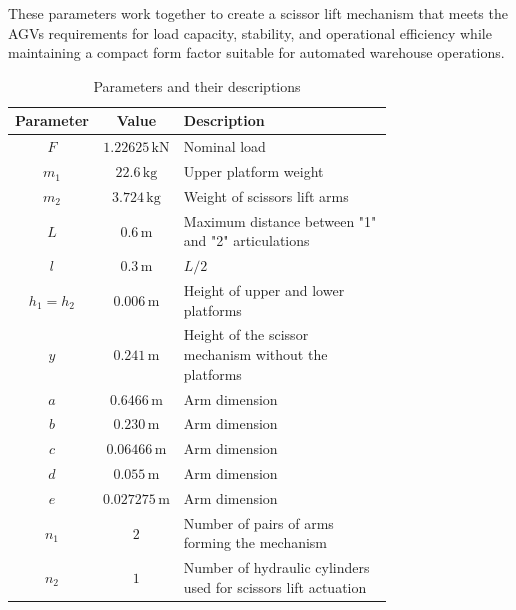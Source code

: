 \documentclass[../../main]{subfiles}
\begin{document}
These parameters work together to create a scissor lift mechanism that
meets the AGV\textquotesingle s requirements for load capacity,
stability, and operational efficiency while maintaining a compact form
factor suitable for automated warehouse operations.
\newpage
\renewcommand{\arraystretch}{1.4} %
\begin{table}[h!]
  \centering
  \begin{tcolorbox}[
    colback=red!5!white,colframe=red!75!black,
    title={\textbf{Parameters}},
    fonttitle=\bfseries, coltitle=white, width=\linewidth
]
  \begin{adjustbox}{max width=\linewidth} %
  \begin{tabular}{|c|c|p{0.75\linewidth}|}
  \hline\rowcolor{red!20}
  \textbf{Parameter} & \textbf{Value} & \textbf{Description} \\ \hline
  $F$ & $1.22625 \, \text{kN}$ & Nominal load \\ \hline
  $m_1$ & $22.6 \, \text{kg}$ & Upper platform weight \\ \hline
  $m_2$ & $3.724 \, \text{kg}$ & Weight of scissors lift arms \\ \hline
  $L$ & $0.6 \, \text{m}$ & Maximum distance between "1" and "2" articulations \\ \hline
  $l$ & $0.3 \, \text{m}$ & $L/2$ \\ \hline
  $h_1 = h_2$ & $0.006 \, \text{m}$ & Height of upper and lower platforms \\ \hline
  $y$ & $0.241 \, \text{m}$ & Height of the scissor mechanism without the platforms \\ \hline
  $a$ & $0.6466 \, \text{m}$ & Arm dimension \\ \hline
  $b$ & $0.230 \, \text{m}$ & Arm dimension \\ \hline
  $c$ & $0.06466 \, \text{m}$ & Arm dimension \\ \hline
  $d$ & $0.055 \, \text{m}$ & Arm dimension \\ \hline
  $e$ & $0.027275 \, \text{m}$ & Arm dimension \\ \hline
  $n_1$ & $2$ & Number of pairs of arms forming the mechanism \\ \hline
  $n_2$ & $1$ & Number of hydraulic cylinders used for scissors lift actuation \\ \hline
  \end{tabular}
\end{adjustbox}
\end{tcolorbox}
\caption{Parameters and their descriptions}
  \end{table}
\end{document}
